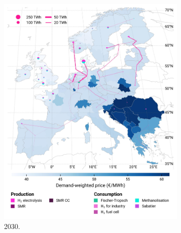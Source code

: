 \documentclass[final,5p,times,twocolumn,sort&compress]{elsarticle}
\begin{document}
\clearpage
\begin{figure}[htbp]
  \centering
  \begin{subfigure}[t]{0.4\textwidth}
      \vspace{0pt}
      \includegraphics[width=1\textwidth,trim=0cm 2.8cm 0cm 0cm, clip]{maps/pcipmi/base_s_adm___2030-balance_map_H2}
      \vspace{-0.5cm}
      \caption{ 2030.}
      \label{fig:PCI_lt_2030_h2}
  \end{subfigure}
  \hfill
  \begin{subfigure}[t]{0.4\textwidth}
      \vspace{0pt}

\end{subfigure}
\end{figure}
\end{document}

